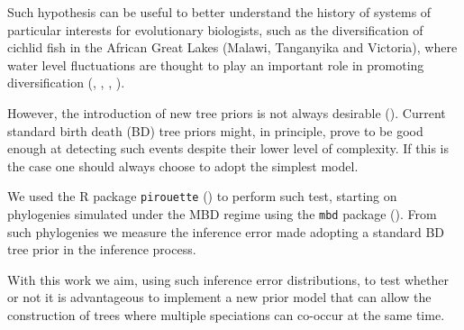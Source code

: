 Such hypothesis can be useful to better understand the history of systems of particular interests for evolutionary biologists, such as the diversification of cichlid fish in the African Great Lakes (Malawi, Tanganyika and Victoria), where water level fluctuations are thought to play an important role in promoting diversification (\citep{verheyen1996mitochondrial}, \citep{sturmbauer2001lake}, \citep{janzen2016}, \citep{janzen2017}).

However, the introduction of new tree priors is not always desirable (\citep{bilderbeek2019pirouette}). Current standard birth death (BD) tree priors might, in principle, prove to be good enough at detecting such events despite their lower level of complexity.
If this is the case one should always choose to adopt the simplest model.

We used the R package \verb;pirouette; (\citep{pirouette}) to perform such test, starting on phylogenies simulated under the MBD regime using the \verb;mbd; package (\citep{mbd}).
From such phylogenies we measure the inference error made adopting a standard BD tree prior in the inference process.

With this work we aim, using such inference error distributions, to test whether or not it is advantageous to implement a new prior model that can allow the construction of trees where multiple speciations can co-occur at the same time.